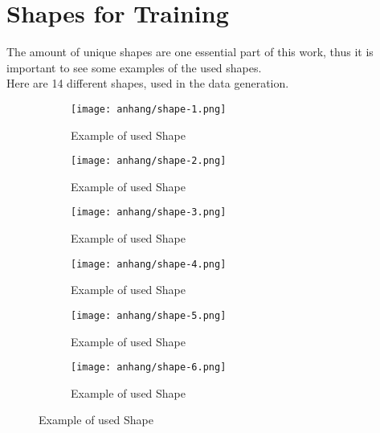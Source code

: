 \chapter{Shapes for Training}
\label{appendix:shapes-for-training}

	The amount of unique shapes are one essential part of this work, thus it is important to see some examples of the used shapes.\\
	Here are 14 different shapes, used in the data generation.
	
	\begin{figure}[h]
		\centering
		\begin{subfigure}{0.45\textwidth}
			\centering
			\texttt{[image: anhang/shape-1.png]}
			\caption[Example of used Shape, created by \cite{Quixel}]{Example of used Shape}
		\end{subfigure}
		\begin{subfigure}{0.45\textwidth}
			\centering
			\texttt{[image: anhang/shape-2.png]}
			\caption[Example of used Shape, created by \cite{Quixel}]{Example of used Shape}
		\end{subfigure}
		
		\begin{subfigure}{0.45\textwidth}
			\centering
			\texttt{[image: anhang/shape-3.png]}
			\caption[Example of used Shape, created by \cite{Quixel}]{Example of used Shape}
		\end{subfigure}
		\begin{subfigure}{0.45\textwidth}
			\centering
			\texttt{[image: anhang/shape-4.png]}
			\caption[Example of used Shape, created by \cite{Quixel}]{Example of used Shape}
		\end{subfigure}
		
		\begin{subfigure}{0.45\textwidth}
			\centering
			\texttt{[image: anhang/shape-5.png]}
			\caption[Example of used Shape, created by \cite{Quixel}]{Example of used Shape}
		\end{subfigure}
		\begin{subfigure}{0.45\textwidth}
			\centering
			\texttt{[image: anhang/shape-6.png]}
			\caption[Example of used Shape, created by \cite{Quixel}]{Example of used Shape}
		\end{subfigure}
	
	\end{figure}
	
	
	
